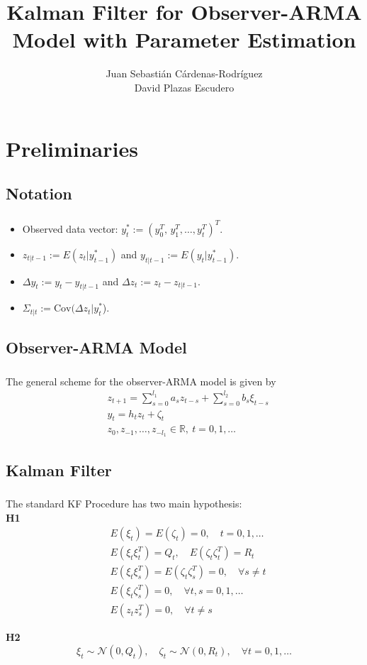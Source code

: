 \documentclass{beamer}
\title{Kalman Filter for Observer-ARMA Model with Parameter Estimation}
\author{Juan Sebasti\'an C\'ardenas-Rodríguez \\ David Plazas Escudero  \\ \vspace{0.5cm} \scalebox{0.7}{Mathematical Engineering, Universidad EAFIT}}
\theoremstyle{definition}
\theoremstyle{remark}
\theoremstyle{example}
\newif\ifinsection
\newif\ifinsubsection
\let\oldsection\section
\renewcommand{\section}{%
  \global\insectiontrue%
  \global\insubsectionfalse%
  \oldsection}
\let\oldsubsection\subsection
\renewcommand{\subsection}{%
  \global\insubsectiontrue%
  \oldsubsection}
\newcommand {\aframe}[1] {%
  \begin{frame}
    \ifinsection\frametitle{\secname}\fi
    \ifinsubsection\framesubtitle{\subsecname}\fi
  #1
  \end{frame}
}
\begin{document}
\begin{frame}[plain]
  \titlepage
\end{frame}

\section{Preliminaries}
\subsection{Notation}
\aframe{
\begin{itemize}
  \item Observed data vector: $y^*_t:=(y_0^T,\,y_1^T,\dots,y_t^T)^T$.
  \item $z_{t|t-1}:=E(z_t|y^*_{t-1})$ and $y_{t|t-1}:=E(y_t|y^*_{t-1})$.
  \item $\Delta y_t:=y_t-y_{t|t-1}$ and $\Delta z_t:=z_t-z_{t|t-1}$.
  \item $\Sigma_{t|t}:=\text{Cov}(\Delta z_t|y_t^*$).
\end{itemize}
}

\subsection{Observer-ARMA Model}
\aframe{
The general scheme for the observer-ARMA model is given by
\begin{equation}
  \begin{split}
    &z_{t+1}=\sum_{s=0}^{l_1}a_sz_{t-s}+\sum_{s=0}^{l_2}b_s\xi_{t-s}\\
    &y_t=h_tz_t+\zeta_t\\
    &z_0,z_{-1},\ldots,z_{-l_1}\in \mathbb{R}, \ t=0,1,\ldots
  \end{split}
\end{equation}
}

\subsection{Kalman Filter}
\aframe{
  The standard KF Procedure \parencite{kalman1960new} has two main hypothesis:\\
  \textbf{H1}
  \[
  \begin{split}
  &E(\xi_t)=E(\zeta_t)=0, \quad t=0,1,\ldots\\
  &E(\xi_t\xi_t^T)=Q_t, \quad E(\zeta_t\zeta_t^T)=R_t\\
  &E(\xi_t\xi_s^T)=E(\zeta_t\zeta_s^T)=0,\quad\forall s\neq t\\
  &E(\xi_t\zeta_s^T)=0, \quad \forall t,s=0,1,\ldots\\
  &E(z_tz_s^T)=0,\quad\forall t\neq s
  \end{split}
  \] \pause

  \textbf{H2}
  \[\xi_t\sim\mathcal{N}(0,Q_t),\quad\zeta_t\sim\mathcal{N}(0,R_t),\quad\forall t=0,1,\ldots\]
}
\end{document}
